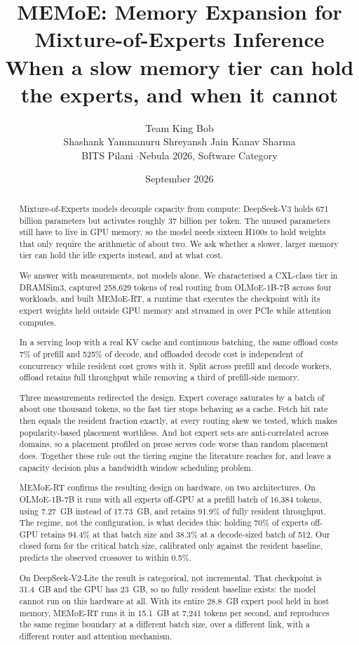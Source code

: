 \documentclass[10pt,a4paper]{article}
\title{\vspace{-1.4cm}\textbf{MEMoE: Memory Expansion for Mixture-of-Experts Inference}\\[4pt]
\large When a slow memory tier can hold the experts, and when it cannot}
\author{Team King Bob\\
\small Shashank Yammanuru \quad Shreyansh Jain \quad Kanav Sharma\\
\small BITS Pilani \quad$\cdot$\quad Nebula 2026, Software Category}
\date{\small September 2026}
\begin{document}
\maketitle

\begin{abstract}
\noindent
Mixture-of-Experts models decouple capacity from compute: DeepSeek-V3 holds 671
billion parameters but activates roughly 37 billion per token. The unused
parameters still have to live in GPU memory, so the model needs sixteen H100s to
hold weights that only require the arithmetic of about two. We ask whether a
slower, larger memory tier can hold the idle experts instead, and at what cost.

We answer with measurements, not models alone. We characterised a CXL-class
tier in DRAMSim3, captured 258{,}629 tokens of real routing from OLMoE-1B-7B across
four workloads, and built MEMoE-RT, a runtime that executes the checkpoint with
its expert weights held outside GPU memory and streamed in over PCIe while
attention computes.

In a serving loop with a real KV cache and continuous batching, the same
offload costs 7\% of prefill and 525\% of decode, and offloaded decode cost is
independent of concurrency while resident cost grows with it. Split across
prefill and decode workers, offload retains full throughput while removing a
third of prefill-side memory.

Three measurements redirected the design. Expert coverage saturates by a batch of
about one thousand tokens, so the fast tier stops behaving as a cache. Fetch hit
rate then equals the resident fraction exactly, at every routing skew we tested,
which makes popularity-based placement worthless. And hot expert sets are
anti-correlated across domains, so a placement profiled on prose serves code worse
than random placement does. Together these rule out the tiering engine the
literature reaches for, and leave a capacity decision plus a bandwidth window
scheduling problem.

MEMoE-RT confirms the resulting design on hardware, on two architectures. On
OLMoE-1B-7B it runs with all experts off-GPU at a prefill batch of 16{,}384
tokens, using 7.27~GB instead of 17.73~GB, and retains 91.9\% of fully resident
throughput. The regime, not the configuration, is what decides this: holding 70\%
of experts off-GPU retains 94.4\% at that batch size and 38.3\% at a decode-sized
batch of 512. Our closed form for the critical batch size, calibrated only against the
resident baseline, predicts the observed crossover to within 0.5\%.

On DeepSeek-V2-Lite the result is categorical, not incremental. That
checkpoint is 31.4~GB and the GPU has 23~GB, so no fully resident baseline
exists: the model cannot run on this hardware at all. With its entire 28.8~GB
expert pool held in host memory, MEMoE-RT runs it in 15.1~GB at 7{,}241 tokens
per second, and reproduces the same regime boundary at a different batch size,
over a different link, with a different router and attention mechanism.
\end{abstract}
\end{document}
